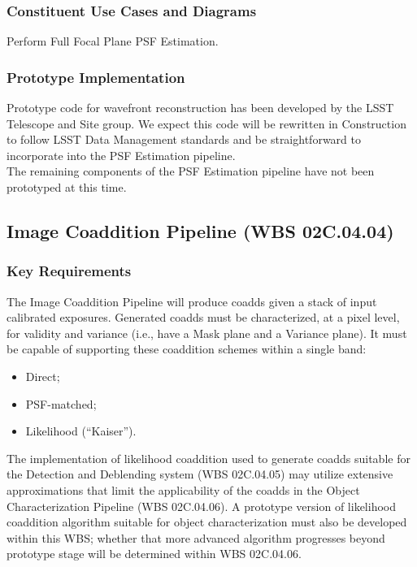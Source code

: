 \documentclass[12pt]{article}
\newcommand{\wbsCoadd}{WBS 02C.04.04}
\newcommand{\wbsDetDeblend}{WBS 02C.04.05}
\newcommand{\wbsObjChar}{WBS 02C.04.06}
\begin{document}
\subsubsection{Constituent Use Cases and Diagrams}

Perform Full Focal Plane PSF Estimation.

\subsubsection{Prototype Implementation}

Prototype code for wavefront reconstruction has been developed by the LSST Telescope and Site group. We expect this code will be rewritten in Construction to follow LSST Data Management standards and be straightforward to incorporate into the PSF Estimation pipeline.
\\

The remaining components of the PSF Estimation pipeline have not been prototyped at this time.

\clearpage

\subsection{Image Coaddition Pipeline (\wbsCoadd)}

\subsubsection{Key Requirements}

The Image Coaddition Pipeline will produce coadds given a stack of input calibrated exposures. Generated coadds must be characterized, at a pixel level, for validity and variance (i.e., have a Mask plane and a Variance plane). It must be capable of supporting these coaddition schemes within a single band:

\begin{itemize}
    \item{Direct;}
    \item{PSF-matched;}
    \item{Likelihood (``Kaiser'').}
\end{itemize}

The implementation of likelihood coaddition used to generate coadds suitable for the Detection and Deblending system (\wbsDetDeblend{}) may utilize extensive approximations that limit the applicability of the coadds in the Object Characterization Pipeline (\wbsObjChar{}). A prototype version of likelihood coaddition algorithm suitable for object characterization must also be developed within this WBS; whether that more advanced algorithm progresses beyond prototype stage will be determined within \wbsObjChar{}.
\end{document}
